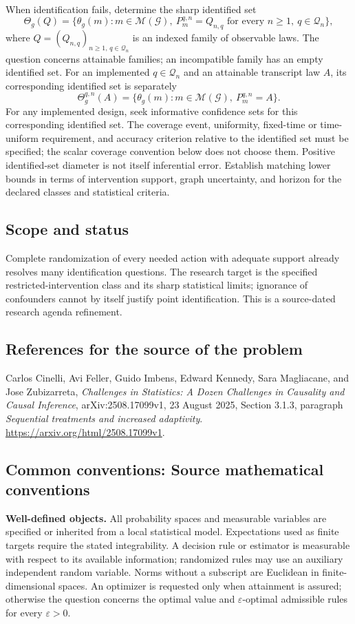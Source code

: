\documentclass[11pt,a4paper]{article}
\begin{document}
When identification fails, determine the sharp identified set
\[
 \Theta_g(Q)=\{\theta_g(m):m\in\mathcal M(\mathcal G),\
       P_m^{q,n}=Q_{n,q}\text{ for every }n\geq1,\ q\in\mathcal Q_n\},
\]
where $Q=(Q_{n,q})_{n\geq1,\,q\in\mathcal Q_n}$ is an indexed family of observable laws. The question concerns attainable families; an incompatible family has an empty identified set. For an implemented $q\in\mathcal Q_n$ and an attainable transcript law $A$, its corresponding identified set is separately
\[
 \Theta_g^{q,n}(A)=\{\theta_g(m):m\in\mathcal M(\mathcal G),\ P_m^{q,n}=A\}.
\]
For any implemented design, seek informative confidence sets for this corresponding identified set. The coverage event, uniformity, fixed-time or time-uniform requirement, and accuracy criterion relative to the identified set must be specified; the scalar coverage convention below does not choose them. Positive identified-set diameter is not itself inferential error. Establish matching lower bounds in terms of intervention support, graph uncertainty, and horizon for the declared classes and statistical criteria.
\subsection*{Scope and status}
Complete randomization of every needed action with adequate support already resolves many identification questions. The research target is the specified restricted-intervention class and its sharp statistical limits; ignorance of confounders cannot by itself justify point identification. This is a source-dated research agenda refinement.
\subsection*{References for the source of the problem}
Carlos Cinelli, Avi Feller, Guido Imbens, Edward Kennedy, Sara Magliacane, and Jose Zubizarreta, \emph{Challenges in Statistics: A Dozen Challenges in Causality and Causal Inference}, arXiv:2508.17099v1, 23 August 2025, Section 3.1.3, paragraph \emph{Sequential treatments and increased adaptivity}. \url{https://arxiv.org/html/2508.17099v1}.

\subsection*{Common conventions: Source mathematical conventions}

\textbf{Well-defined objects.}
All probability spaces and measurable variables are specified or inherited
from a local statistical model. Expectations used as finite targets require
the stated integrability. A decision rule or estimator is measurable with
respect to its available information; randomized rules may use an auxiliary
independent random variable. Norms without a subscript are Euclidean in
finite-dimensional spaces. An optimizer is requested only when attainment
is assured; otherwise the question concerns the optimal value and
$\varepsilon$-optimal admissible rules for every $\varepsilon>0$.
\end{document}
